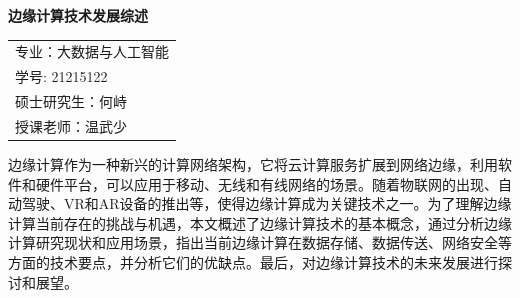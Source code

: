 \documentclass[UTF8,12pt,twoside,a4paper]{ctexart} %
\begin{document}
\setcounter{page}{1}%


\begin{titlepage}
	\begin{center}
		\bfseries 边缘计算技术发展综述\\%
		\vspace*{36pt}%
		\songti{}
		\begin{tabular}{l}
			{专业：大数据与人工智能}\\
			{学号: 21215122}\\
			{硕士研究生：何峙}\\
			{授课老师：温武少}\\
		\end{tabular}

		\vspace*{36pt}
		\heiti{\zihao{-2}{摘要}}
			\vspace*{16pt}
	\end{center}
		
	\songti{}
边缘计算作为一种新兴的计算网络架构，它将云计算服务扩展到网络边缘，利用软件和硬件平台，可以应用于移动、无线和有线网络的场景。随着物联网的出现、自动驾驶、VR和AR设备的推出等，使得边缘计算成为关键技术之一。为了理解边缘计算当前存在的挑战与机遇，本文概述了边缘计算技术的基本概念，通过分析边缘计算研究现状和应用场景，指出当前边缘计算在数据存储、数据传送、网络安全等方面的技术要点，并分析它们的优缺点。最后，对边缘计算技术的未来发展进行探讨和展望。

    \begin{flushleft}
         
    \end{flushleft}

\end{titlepage}


\tableofcontents%
\clearpage{\pagestyle{empty}}
\mbox{}
\end{document}
